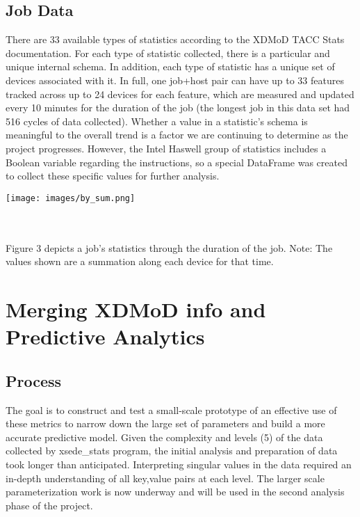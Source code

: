 \documentclass[10pt]{article}
\newenvironment{boxit}{
   \begin{lrbox}{\dummybox}
      \begin{minipage}{0.925\columnwidth}
      }{
      \end{minipage}
   \end{lrbox}
   \raisebox{-\depth}
      {\psshadowbox[framesep=1em,framearc=0.1,shadow=true]
         {\usebox{\dummybox}}}
   \vspace{0.005\textheight}
}
\begin{document}
\begin{center}
\begin{multicols}{3}
	 \begin{boxit}
	 \subsection*{\red Job Data}
	 \vspace{-0.75em}
                There are 33 available types of statistics according to the XDMoD TACC Stats documentation. For each type of statistic collected, there is a particular and unique internal schema. In addition, each type of statistic has a unique set of devices associated with it. In full, one job+host pair can have up to 33 features tracked across up to 24 devices for each feature, which are measured and updated every 10 minutes for the duration of the job (the longest job in this data set had 516 cycles of data collected). Whether a value in a statistic's schema is meaningful to the overall trend is a factor we are continuing to determine as the project progresses. However, the Intel Haswell group of statistics includes a Boolean variable regarding the instructions, so a special DataFrame was created to collect these specific values for further analysis.
                \\
                
                \parbox[c]{8.5cm}{\texttt{[image: images/by\_sum.png]}}\\
	        \label{Figure 3}
	        \\Figure 3 depicts a job's statistics through the duration of the job. Note: The values shown are a summation along each device for that time.
            \section*{\red Merging XDMoD info and Predictive Analytics}
            \vspace{-0.75em}
            \subsection*{\red Process}
            \vspace{-0.5em}
            The goal is to construct and test a small-scale prototype of an effective use of these metrics to narrow down the large set of parameters and build a more accurate predictive model. Given the complexity and levels (5) of the data collected by xsede_stats program, the initial analysis and preparation of data took longer than anticipated. Interpreting singular values in the data required an in-depth understanding of all key,value pairs at each level. The larger scale parameterization work is now underway and will be used in the second analysis phase of the project.
            

\end{boxit}
\end{multicols}
\end{center}
\end{document}

